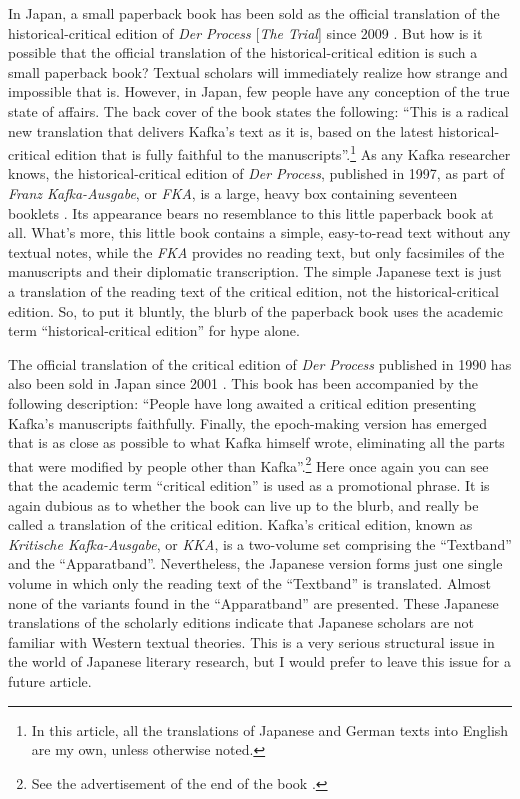 \documentclass{article}
\begin{document}
In Japan, a small paperback book has been sold as the official
translation of the historical-critical edition of \emph{Der Process}
{[}\emph{The Trial}{]} since 2009 \citep{kafka_sosho_2009}. But how is it possible
that the official translation of the historical-critical edition is such
a small paperback book? Textual scholars will immediately realize how
strange and impossible that is. However, in Japan, few people have any
conception of the true state of affairs. The back cover of the book
states the following: ``This is a radical new translation that delivers
Kafka's text as it is, based on the latest historical-critical edition
that is fully faithful to the manuscripts''.\footnote{In this article,
  all the translations of Japanese and German texts into English are my
  own, unless otherwise noted.} As any Kafka researcher knows, the
historical-critical edition of \emph{Der Process}, published in 1997,
as part of \emph{Franz Kafka-Ausgabe}, or \emph{FKA}, is a large,
heavy box containing seventeen booklets \citep{kafka_process_1997}. Its appearance
bears no resemblance to this little paperback book at all. What's more,
this little book contains a simple, easy-to-read text without any
textual notes, while the \emph{FKA} provides no reading text, but only
facsimiles of the manuscripts and their diplomatic transcription. The
simple Japanese text is just a translation of the reading text of the
critical edition, not the historical-critical edition. So, to put it
bluntly, the blurb of the paperback book uses the academic term
``historical-critical edition'' for hype alone.

The official translation of the critical edition of \emph{Der Process}
published in 1990 \citep{kafka_proces_1990-1,kafka_proces_1990} has also been sold in Japan
since 2001 \citep{kafka_shinpan_2001}. This book has been accompanied by the following
description: ``People have long awaited a critical edition presenting Kafka's
manuscripts faithfully. Finally, the epoch-making version has emerged
that is as close as possible to what Kafka himself wrote, eliminating
all the parts that were modified by people other than
Kafka''.\footnote{See the advertisement of the end of the book \citep{kafka_shinpan_2001}.} Here once again you can see that the academic term ``critical
edition'' is used as a promotional phrase. It is again dubious as to
whether the book can live up to the blurb, and really be called a
translation of the critical edition. Kafka's critical edition, known as
\emph{Kritische Kafka-Ausgabe}, or \emph{KKA}, is a two-volume set
comprising the ``Textband'' and the ``Apparatband''. Nevertheless, the
Japanese version forms just one single volume in which only the reading
text of the ``Textband'' is translated. Almost none of the variants
found in the ``Apparatband'' are presented. These Japanese translations
of the scholarly editions indicate that Japanese scholars are not
familiar with Western textual theories. This is a very serious
structural issue in the world of Japanese literary research, but I would
prefer to leave this issue for a future article.
\end{document}
